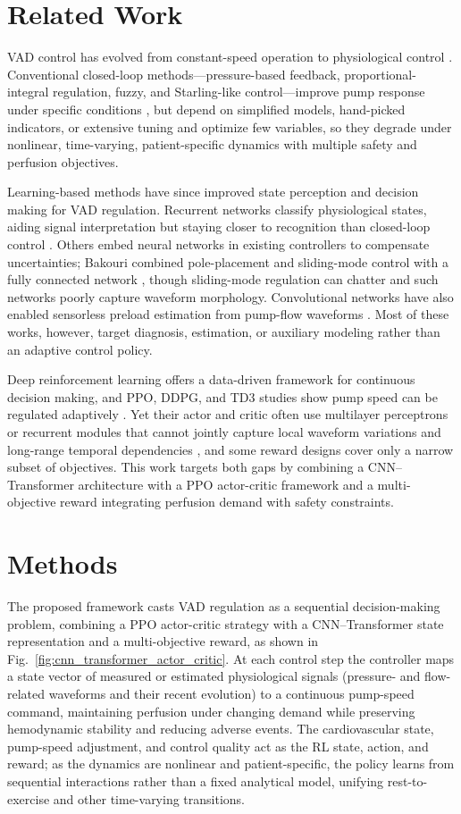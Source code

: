 \documentclass[sigconf]{acmart}
\begin{document}
\section{Related Work}
VAD control has evolved from constant-speed operation to physiological control \cite{b2}. Conventional closed-loop methods---pressure-based feedback, proportional-integral regulation, fuzzy, and Starling-like control---improve pump response under specific conditions \cite{b4,b5,b6,b7}, but depend on simplified models, hand-picked indicators, or extensive tuning and optimize few variables, so they degrade under nonlinear, time-varying, patient-specific dynamics with multiple safety and perfusion objectives.

Learning-based methods have since improved state perception and decision making for VAD regulation. Recurrent networks classify physiological states, aiding signal interpretation but staying closer to recognition than closed-loop control \cite{b8}. Others embed neural networks in existing controllers to compensate uncertainties; Bakouri combined pole-placement and sliding-mode control with a fully connected network \cite{b13}, though sliding-mode regulation can chatter and such networks poorly capture waveform morphology. Convolutional networks have also enabled sensorless preload estimation from pump-flow waveforms \cite{b15}. Most of these works, however, target diagnosis, estimation, or auxiliary modeling rather than an adaptive control policy.

Deep reinforcement learning offers a data-driven framework for continuous decision making, and PPO, DDPG, and TD3 studies show pump speed can be regulated adaptively \cite{b10,b11,b12}. Yet their actor and critic often use multilayer perceptrons or recurrent modules that cannot jointly capture local waveform variations and long-range temporal dependencies \cite{b10,b11}, and some reward designs cover only a narrow subset of objectives. This work targets both gaps by combining a CNN--Transformer architecture with a PPO actor-critic framework and a multi-objective reward integrating perfusion demand with safety constraints.

\section{Methods}
The proposed framework casts VAD regulation as a sequential decision-making problem, combining a PPO actor-critic strategy with a CNN--Transformer state representation and a multi-objective reward, as shown in Fig.~\ref{fig:cnn_transformer_actor_critic}. At each control step the controller maps a state vector of measured or estimated physiological signals (pressure- and flow-related waveforms and their recent evolution) to a continuous pump-speed command, maintaining perfusion under changing demand while preserving hemodynamic stability and reducing adverse events. The cardiovascular state, pump-speed adjustment, and control quality act as the RL state, action, and reward; as the dynamics are nonlinear and patient-specific, the policy learns from sequential interactions rather than a fixed analytical model, unifying rest-to-exercise and other time-varying transitions.
\end{document}
